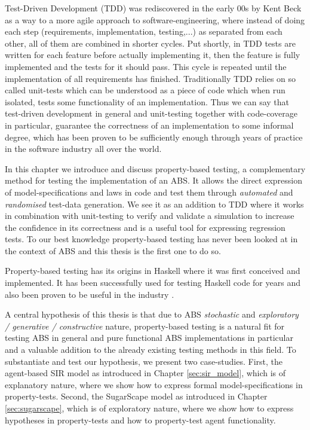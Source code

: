 Test-Driven Development (TDD) was rediscovered in the early 00s by Kent Beck \cite{beck_test_2002} as a way to a more agile approach to software-engineering, where instead of doing each step (requirements, implementation, testing,...) as separated from each other, all of them are combined in shorter cycles. Put shortly, in TDD tests are written for each feature before actually implementing it, then the feature is fully implemented and the tests for it should pass. This cycle is repeated until the implementation of all requirements has finished. Traditionally TDD relies on so called unit-tests which can be understood as a piece of code which when run isolated, tests some functionality of an implementation. Thus we can say that test-driven development in general and unit-testing together with code-coverage in particular, guarantee the correctness of an implementation to some informal degree, which has been proven to be sufficiently enough through years of practice in the software industry all over the world. 

\medskip

In this chapter we introduce and discuss property-based testing, a complementary method for testing the implementation of an ABS. It allows the direct expression of model-specifications and laws in code and test them through \textit{automated} and \textit{randomised} test-data generation. We see it as an addition to TDD where it works in combination with unit-testing to verify and validate a simulation to increase the confidence in its correctness and is a useful tool for expressing regression tests. To our best knowledge property-based testing has never been looked at in the context of ABS and this thesis is the first one to do so.

Property-based testing has its origins \cite{claessen_quickcheck_2000,claessen_testing_2002,runciman_smallcheck_2008} in Haskell where it was first conceived and implemented. It has been successfully used for testing Haskell code for years and also been proven to be useful in the industry \cite{hughes_quickcheck_2007}.

A central hypothesis of this thesis is that due to ABS \textit{stochastic} and \textit{exploratory / generative / constructive } nature, property-based testing is a natural fit for testing ABS in general and pure functional ABS implementations in particular and a valuable addition to the already existing testing methods in this field. To substantiate and test our hypothesis, we present two case-studies. First, the agent-based SIR model as introduced in Chapter \ref{sec:sir_model}, which is of explanatory nature, where we show how to express formal model-specifications in property-tests. Second, the SugarScape model as introduced in Chapter \ref{sec:sugarscape}, which is of exploratory nature, where we show how to express hypotheses in property-tests and how to property-test agent functionality. 

